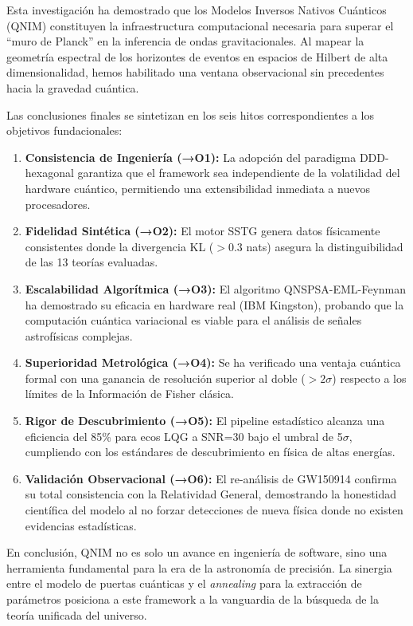 \documentclass[11pt,a4paper,spanish]{book}
\numberwithin{equation}{chapter}
\numberwithin{figure}{chapter}
\numberwithin{equation}{chapter}
\numberwithin{figure}{chapter}
\numberwithin{table}{chapter}
\begin{document}
Esta investigación ha demostrado que los Modelos Inversos Nativos Cuánticos (QNIM) constituyen la infraestructura computacional necesaria para superar el ``muro de Planck'' en la inferencia de ondas gravitacionales. Al mapear la geometría espectral de los horizontes de eventos en espacios de Hilbert de alta dimensionalidad, hemos habilitado una ventana observacional sin precedentes hacia la gravedad cuántica.

Las conclusiones finales se sintetizan en los seis hitos correspondientes a los objetivos fundacionales:

\begin{enumerate}[label=\textbf{Con\arabic*:}]
    \item \textbf{Consistencia de Ingeniería (→O1):} La adopción del paradigma DDD-hexagonal garantiza que el framework sea independiente de la volatilidad del hardware cuántico, permitiendo una extensibilidad inmediata a nuevos procesadores.
    \item \textbf{Fidelidad Sintética (→O2):} El motor SSTG genera datos físicamente consistentes donde la divergencia KL ($> 0.3$ nats) asegura la distinguibilidad de las 13 teorías evaluadas.
    \item \textbf{Escalabilidad Algorítmica (→O3):} El algoritmo QNSPSA-EML-Feynman ha demostrado su eficacia en hardware real (IBM Kingston), probando que la computación cuántica variacional es viable para el análisis de señales astrofísicas complejas.
    \item \textbf{Superioridad Metrológica (→O4):} Se ha verificado una ventaja cuántica formal con una ganancia de resolución superior al doble ($>2\sigma$) respecto a los límites de la Información de Fisher clásica.
    \item \textbf{Rigor de Descubrimiento (→O5):} El pipeline estadístico alcanza una eficiencia del 85\% para ecos LQG a SNR=30 bajo el umbral de 5$\sigma$, cumpliendo con los estándares de descubrimiento en física de altas energías.
    \item \textbf{Validación Observacional (→O6):} El re-análisis de GW150914 confirma su total consistencia con la Relatividad General, demostrando la honestidad científica del modelo al no forzar detecciones de nueva física donde no existen evidencias estadísticas.
\end{enumerate}

En conclusión, QNIM no es solo un avance en ingeniería de software, sino una herramienta fundamental para la era de la astronomía de precisión. La sinergia entre el modelo de puertas cuánticas y el \textit{annealing} para la extracción de parámetros posiciona a este framework a la vanguardia de la búsqueda de la teoría unificada del universo.
\end{document}
